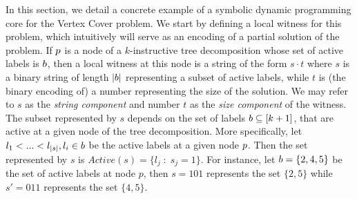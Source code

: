In this section, we detail a concrete example of a symbolic dynamic programming core for the {\sc Vertex Cover} problem. We start by defining a local witness for this problem, which intuitively will serve as an encoding of a partial solution of the problem. 
If $p$ is a node of a $k$-instructive tree decomposition whose set of active labels is $b$, then a local witness at this node is a string of the form $s\cdot t$ where $s$ is a binary string of length $|b|$ representing a subset of active labels, while $t$ is (the binary encoding of) a number representing the size of the solution. We may refer to $s$ as the \textit{string component} and number $t$ as the \textit{size component} of the witness. The subset represented by $s$ depends on the set of labels $b \subseteq [k+1]$, that are active at a given node of the tree decomposition. More specifically, let $l_1 < ... < l_{|s|}, l_i \in b$ be the active labels at a given node $p$. Then the set represented by $s$ is $Active(s) = \{l_j \;:\; s_j=1\}$. For instance, let
$b = \{2,4,5\}$ be the set of active labels at node $p$, then $s=101$ represents the set $\{2,5\}$ while $s'=011$ represents the set $\{4,5\}$. 

